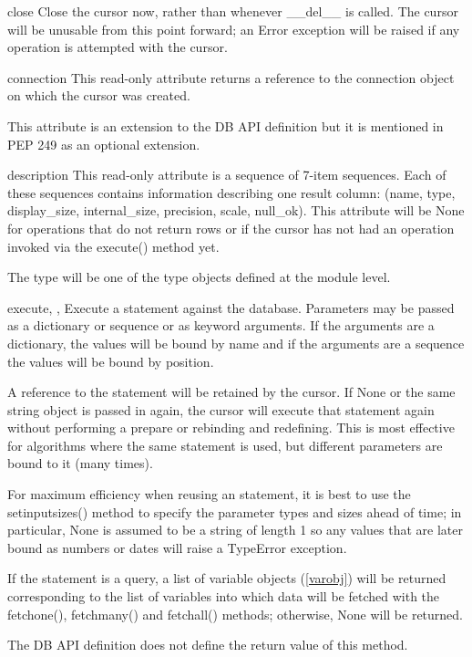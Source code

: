 \documentclass{manual}
\begin{document}
\begin{funcdesc}{close}{}
  Close the cursor now, rather than whenever __del__ is called. The cursor will
  be unusable from this point forward; an Error exception will be raised if any
  operation is attempted with the cursor.
\end{funcdesc}

\begin{datadesc}{connection}
  This read-only attribute returns a reference to the connection object on
  which the cursor was created.

   This attribute is an extension to the DB API definition but it
  is mentioned in PEP 249 as an optional extension.
\end{datadesc}

\begin{datadesc}{description}
  This read-only attribute is a sequence of 7-item sequences. Each of these
  sequences contains information describing one result column: (name, type,
  display_size, internal_size, precision, scale, null_ok). This attribute will
  be None for operations that do not return rows or if the cursor has not had
  an operation invoked via the execute() method yet.

  The type will be one of the type objects defined at the module level.
\end{datadesc}

\begin{funcdesc}{execute}{, ,
    }
  Execute a statement against the database. Parameters may be passed as a
  dictionary or sequence or as keyword arguments. If the arguments are a
  dictionary, the values will be bound by name and if the arguments are a
  sequence the values will be bound by position.

  A reference to the statement will be retained by the cursor. If None or the
  same string object is passed in again, the cursor will execute that
  statement again without performing a prepare or rebinding and redefining.
  This is most effective for algorithms where the same statement is used, but
  different parameters are bound to it (many times).

  For maximum efficiency when reusing an statement, it is best to use the
  setinputsizes() method to specify the parameter types and sizes ahead of
  time; in particular, None is assumed to be a string of length 1 so any
  values that are later bound as numbers or dates will raise a TypeError
  exception.

  If the statement is a query, a list of variable objects (\ref{varobj}) will
  be returned corresponding to the list of variables into which data will be
  fetched with the fetchone(), fetchmany() and fetchall() methods; otherwise,
  None will be returned.

   The DB API definition does not define the return value of this
  method.
\end{funcdesc}
\end{document}
